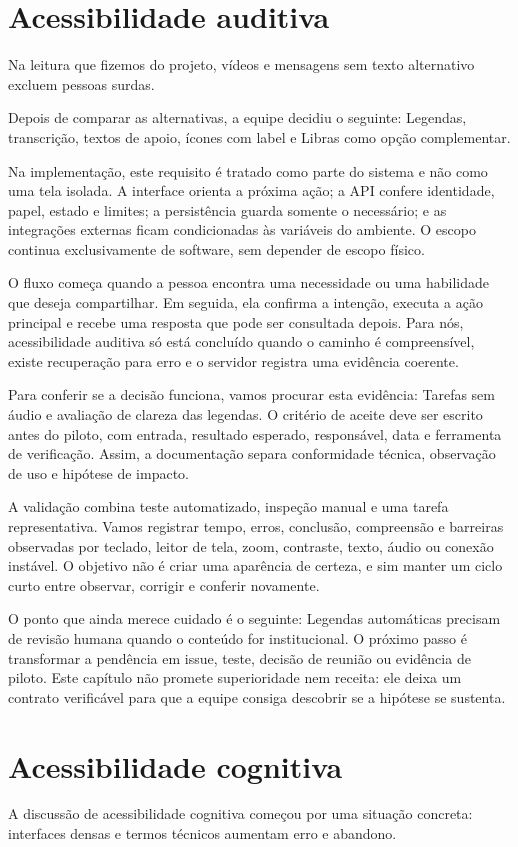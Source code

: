 \documentclass[12pt,oneside,a4paper,article]{abntex2}
\begin{document}
\section{Acessibilidade auditiva}
Na leitura que fizemos do projeto, vídeos e mensagens sem texto alternativo excluem pessoas surdas.

Depois de comparar as alternativas, a equipe decidiu o seguinte: Legendas, transcrição, textos de apoio, ícones com label e Libras como opção complementar.

Na implementação, este requisito é tratado como parte do sistema e não como uma tela isolada. A interface orienta a próxima ação; a API confere identidade, papel, estado e limites; a persistência guarda somente o necessário; e as integrações externas ficam condicionadas às variáveis do ambiente. O escopo continua exclusivamente de software, sem depender de escopo físico.

O fluxo começa quando a pessoa encontra uma necessidade ou uma habilidade que deseja compartilhar. Em seguida, ela confirma a intenção, executa a ação principal e recebe uma resposta que pode ser consultada depois. Para nós, acessibilidade auditiva só está concluído quando o caminho é compreensível, existe recuperação para erro e o servidor registra uma evidência coerente.

Para conferir se a decisão funciona, vamos procurar esta evidência: Tarefas sem áudio e avaliação de clareza das legendas. O critério de aceite deve ser escrito antes do piloto, com entrada, resultado esperado, responsável, data e ferramenta de verificação. Assim, a documentação separa conformidade técnica, observação de uso e hipótese de impacto.

A validação combina teste automatizado, inspeção manual e uma tarefa representativa. Vamos registrar tempo, erros, conclusão, compreensão e barreiras observadas por teclado, leitor de tela, zoom, contraste, texto, áudio ou conexão instável. O objetivo não é criar uma aparência de certeza, e sim manter um ciclo curto entre observar, corrigir e conferir novamente.

O ponto que ainda merece cuidado é o seguinte: Legendas automáticas precisam de revisão humana quando o conteúdo for institucional. O próximo passo é transformar a pendência em issue, teste, decisão de reunião ou evidência de piloto. Este capítulo não promete superioridade nem receita: ele deixa um contrato verificável para que a equipe consiga descobrir se a hipótese se sustenta.

\section{Acessibilidade cognitiva}
A discussão de acessibilidade cognitiva começou por uma situação concreta: interfaces densas e termos técnicos aumentam erro e abandono.
\end{document}
